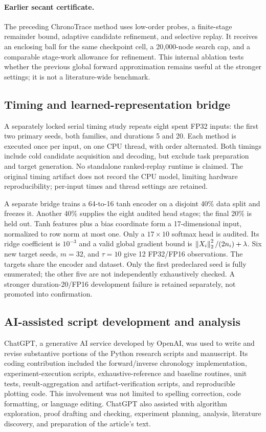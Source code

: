 \paragraph{Earlier secant certificate.}
The preceding ChronoTrace method uses low-order probes, a finite-stage remainder bound, adaptive candidate refinement, and selective replay. It receives an enclosing ball for the same checkpoint cell, a 20,000-node search cap, and a comparable stage-work allowance for refinement. This internal ablation tests whether the previous global forward approximation remains useful at the stronger settings; it is not a literature-wide benchmark.

\subsection{Timing and learned-representation bridge}
A separately locked serial timing study repeats eight spent FP32 inputs: the first two primary seeds, both families, and durations 5 and 20. Each method is executed once per input, on one CPU thread, with order alternated. Both timings include cold candidate acquisition and decoding, but exclude task preparation and target generation. No standalone ranked-replay runtime is claimed. The original timing artifact does not record the CPU model, limiting hardware reproducibility; per-input times and thread settings are retained.

A separate bridge trains a 64-to-16 tanh encoder on a disjoint 40\% data split and freezes it. Another 40\% supplies the eight audited head stages; the final 20\% is held out. Tanh features plus a bias coordinate form a 17-dimensional input, normalized to row norm at most one. Only a $17\times10$ softmax head is audited. Its ridge coefficient is $10^{-3}$ and a valid global gradient bound is $\left\lVert X_i\right\rVert_2^2/(2n_i)+\lambda$. Six new target seeds, $m=32$, and $\tau=10$ give 12 FP32/FP16 observations. The targets share the encoder and dataset. Only the first predeclared seed is fully enumerated; the other five are not independently exhaustively checked. A stronger duration-20/FP16 development failure is retained separately, not promoted into confirmation.

\subsection{AI-assisted script development and analysis}
ChatGPT, a generative AI service developed by OpenAI, was used to write and revise substantive portions of the Python research scripts and manuscript. Its coding contribution included the forward/inverse chronology implementation, experiment-execution scripts, exhaustive-reference and baseline routines, unit tests, result-aggregation and artifact-verification scripts, and reproducible plotting code. This involvement was not limited to spelling correction, code formatting, or language editing. ChatGPT also assisted with algorithm exploration, proof drafting and checking, experiment planning, analysis, literature discovery, and preparation of the article's text.

